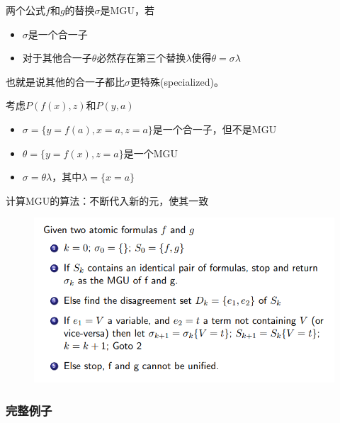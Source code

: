 \begin{definition}
两个公式$f$和$g$的替换$\sigma$是MGU，若
\begin{itemize}
	\item $\sigma$是一个合一子
	\item 对于其他合一子$\theta$必然存在第三个替换$\lambda$使得$\theta=\sigma\lambda$
\end{itemize}
也就是说其他的合一子都比$\sigma$更特殊(specialized)。
\end{definition}
\begin{example}
考虑$P(f(x),z)$和$P(y,a)$
\begin{itemize}
	\item $\sigma=\{y=f(a),x=a,z=a\}$是一个合一子，但不是MGU
	\item $\theta=\{y=f(x),z=a\}$是一个MGU
	\item $\sigma=\theta\lambda$，其中$\lambda=\{x=a\}$
\end{itemize}
\end{example}

计算MGU的算法：不断代入新的元，使其一致
\begin{figure}[H]
\centering
\includegraphics[width=0.8\linewidth]{fig/MGU.png}
\end{figure}

\subsubsection{完整例子}

